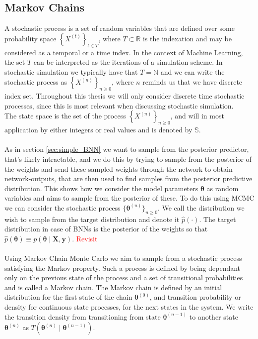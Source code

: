 \subsection{Markov Chains}\label{sec:basic_mc}

A stochastic process is a set of random variables that are defined over some probability space $\left\{X^{(t)} \right\}_{t\in T}$, where $T\subset \mathbb{R}$ is the indexation and may be considered as a temporal or a time index. In the context of Machine Learning, the set $T$ can be interpreted as the iterations of a simulation scheme. In stochastic simulation we typically have that $T=\mathbb{N}$ and we can write the stochastic process as $\left\{X^{(n)}\right\}_{n\geq 0}$, where $n$ reminds us that we have discrete index set. Throughout this thesis we will only consider discrete time stochastic processes, since this is most relevant when discussing stochastic simulation. \\
The state space is the set of the process $\left\{X^{(n)} \right\}_{n\geq 0}$, and will in most application by either integers or real values and is denoted by $\mathbb{S}$. 
\\
\\
As in section \ref{sec:simple_BNN} we want to sample from the posterior predictor, that's likely intractable, and we do this by trying to sample from the posterior of the weights and send these sampled weights through the network to obtain network-outputs, that are then used to find samples from the posterior predictive distribution. This shows how we consider the model parameters $\boldsymbol{\theta}$ as random variables and aims to sample from the posterior of these. To do this using MCMC we can consider the stochastic process $\{\boldsymbol{\theta}^{(n)}\}_{n\geq 0}$. We call the distribution we wish to sample from the target distribution and denote it $\hat{p}(\cdot)$. The target distribution in case of BNNs is the posterior of the weights so that $\hat{p}(\boldsymbol{\theta})\equiv p(\boldsymbol{\theta}\mid \mathbf{X},\mathbf{y})$. \textcolor{red}{Revisit}
\\
\\
Using Markov Chain Monte Carlo we aim to sample from a stochastic process satisfying the Markov property. Such a process is defined by being dependant only on the previous state of the process and a set of transitional probabilities and is called a Markov chain. The Markov chain is defined by an initial distribution for the first state of the chain $\boldsymbol{\theta}^{(0)}$, and transition probability or density for continuous state processes, for the next states in the system. We write the transition density from transitioning from state $\boldsymbol{\theta}^{(n-1)}$ to another state $\boldsymbol{\theta}^{(n)}$ as $T(\boldsymbol{\theta}^{(n)}\mid \boldsymbol{\theta}^{(n-1)})$. \\
